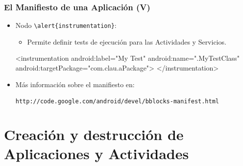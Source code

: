\documentclass[hyperref={pdfpagelabels=true},ucs]{beamer}
\begin{document}
\begin{frame}[fragile]
\frametitle{El Manifiesto de una Aplicación (V)}  

\begin{itemize}

\item Nodo \Verb|\alert{instrumentation}|:

  \begin{itemize}
  \item Permite definir tests de ejecución para las Actividades
    y Servicios.
  \end{itemize}

\begin{scriptsize}
\begin{block}{}
\begin{xml}
<instrumentation android:label="My Test"
                 android:name=".MyTestClass"
                 android:targetPackage="com.clau.aPackage">
</instrumentation>
\end{xml}
\end{block}
\end{scriptsize}

\item Más información sobre el manifiesto en:\\
  \begin{scriptsize}
    \Verb|http://code.google.com/android/devel/bblocks-manifest.html|
  \end{scriptsize}
\end{itemize}

\end{frame}



\section{Creación y destrucción de Aplicaciones y Actividades}
\end{document}
